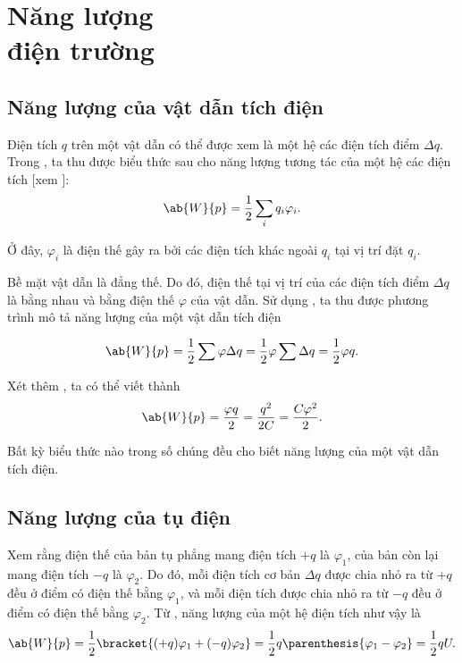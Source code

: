 \chapter[Năng lượng điện trường]{Năng lượng \\điện trường}\label{chap:4}

\section{Năng lượng của vật dẫn tích điện}\label{sec:4_1}

Điện tích $q$ trên một vật dẫn có thể được xem là một hệ các điện tích điểm $\Delta{q}$. Trong , ta thu được biểu thức sau cho năng lượng tương tác của một hệ các điện tích [xem ]:
\begin{equation}\label{eq:4_1}
	\ab{W}{p} = \frac{1}{2} \sum_i q_i \varphi_i.
\end{equation}

\noindent
Ở đây, $\varphi_i$ là điện thế gây ra bởi các điện tích khác ngoài $q_i$ tại vị trí đặt $q_i$.

Bề mặt vật dẫn là đẳng thế. Do đó, điện thế tại vị trí của các điện tích điểm $\Delta{q}$ là bằng nhau và bằng điện thế $\varphi$ của vật dẫn. Sử dụng , ta thu được phương trình mô tả năng lượng của một vật dẫn tích điện

\begin{equation}\label{eq:4_2}
	\ab{W}{p} = \frac{1}{2} \sum \varphi \Delta{q} = \frac{1}{2} \varphi \sum \Delta{q} = \frac{1}{2} \varphi q.
\end{equation}

\noindent
Xét thêm , ta có thể viết thành
\begin{equation}\label{eq:4_3}
	\ab{W}{p} = \frac{\varphi q}{2} = \frac{q^2}{2 C} = \frac{C \varphi^2}{2}.
\end{equation}

\noindent
Bất kỳ biểu thức nào trong số chúng đều cho biết năng lượng của một vật dẫn tích điện.

\section{Năng lượng của tụ điện}\label{sec:4_2}

Xem rằng điện thế của bản tụ phẳng mang điện tích $+q$ là $\varphi_1$, của bản còn lại mang điện tích $-q$ là $\varphi_2$. Do đó, mỗi điện tích cơ bản $\Delta{q}$ được chia nhỏ ra từ $+q$ đều ở điểm có điện thế bằng $\varphi_1$, và mỗi điện tích được chia nhỏ ra từ $-q$ đều ở điểm có điện thế bằng $\varphi_2$. Từ , năng lượng của một hệ điện tích như vậy là
\begin{equation}\label{eq:4_4}
	\ab{W}{p} = \frac{1}{2} \bracket{ (+q) \varphi_1 + (-q) \varphi_2} = \frac{1}{2} q \parenthesis{\varphi_1 - \varphi_2} = \frac{1}{2} q U.
\end{equation}

